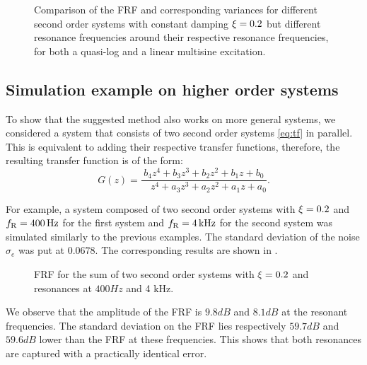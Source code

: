 \begin{figure}%
  \centering
  \setlength{\figurewidth}{0.8\columnwidth}
  \setlength{\figureheight}{5cm}
  
  \caption{Comparison of the FRF and corresponding variances for
           different second order systems with constant damping
           $\xi=0.2$ but different resonance frequencies around
           their respective resonance frequencies, for both a quasi-log 
           and a linear multisine excitation.}%
  \label{fig:damping02}
\end{figure}

\subsection{Simulation example on higher order systems}
To show that the suggested method also works on more general systems,
we considered a system that consists of two second order systems \eqref{eq:tf} in 
parallel. This is equivalent to adding their respective transfer functions,
therefore, the resulting transfer function is of the form:
\begin{equation}
  G \left( z \right) 
  = \frac{         b_4 z^{4} + b_3 z^{3} + b_2 z^{2} + b_1 z + b_0}%
         {\phantom{a_4}z^{4} + a_3 z^{3} + a_2 z^{2} + a_1 z + a_0}
  \text{.}
\label{eq:tfO4}
\end{equation}

For example, a system composed of two second order systems with $\xi = 0.2$
and $f_{\mathrm{R}} = 400 \,\mathrm{Hz}$ for the first system and $f_{\mathrm{R}}=4 \,\mathrm{kHz}$ for the second
system was simulated similarly to the previous examples. The standard deviation
of the noise $\sigma_e$ was put at $0.0678$. The corresponding results are 
shown in .

\begin{figure}%
  \centering
  \setlength{\figurewidth}{0.8\columnwidth}
  \setlength{\figureheight}{5cm}
  
  \caption{FRF for the sum of two second order systems with $\xi=0.2$ and
           resonances at $ 400 \unit{Hz}$ and 4 \unit{kHz}.}%
  \label{fig:sumSys}
\end{figure}

We observe that the amplitude of the FRF is $9.8\unit{dB}$ and $8.1\unit{dB}$ at the resonant frequencies.
The standard deviation on the FRF lies respectively $59.7 \unit{dB}$ and $59.6 \unit{dB}$ lower than the FRF at these frequencies. 
This shows that both resonances are captured with a practically identical error. 

